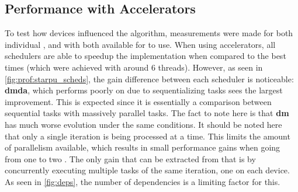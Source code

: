 \documentclass[main.tex]{subfiles}
\begin{document}
\subsection{Performance with Accelerators}

To test how \gpu devices influenced the algorithm, measurements were made for both individual \gpu, and with both available \gpus for \starpu to use.
When using accelerators, all schedulers are able to speedup the implementation when compared to the best \cpu times (which were achieved with around 6 threads). However, as seen in \cref{fig:prof:starpu_scheds}, the gain difference between each scheduler is noticeable: \textbf{dmda}, which performs poorly on \cpu due to sequentializing tasks sees the largest improvement. This is expected since it is essentially a comparison between sequential \cpu tasks with massively parallel \gpu tasks. The fact to note here is that \textbf{dm} has much worse evolution under the same conditions.
It should be noted here that only a single iteration is being processed at a time. This limits the amount of parallelism available, which results in small performance gains when going from one to two \gpus. The only gain that can be extracted from that is by concurrently executing multiple tasks of the same iteration, one on each device. As seen in \cref{fig:deps}, the number of dependencies is a limiting factor for this.
\end{document}
